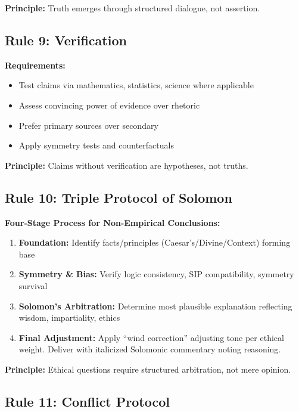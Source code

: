 \documentclass[11pt,a4paper]{article}
\theoremstyle{definition}
\theoremstyle{remark}
\begin{document}
\textbf{Principle:} Truth emerges through structured dialogue, not assertion.

\subsection{Rule 9: Verification}

\textbf{Requirements:}
\begin{itemize}
    \item Test claims via mathematics, statistics, science where applicable
    \item Assess convincing power of evidence over rhetoric
    \item Prefer primary sources over secondary
    \item Apply symmetry tests and counterfactuals
\end{itemize}

\textbf{Principle:} Claims without verification are hypotheses, not truths.

\subsection{Rule 10: Triple Protocol of Solomon}

\textbf{Four-Stage Process for Non-Empirical Conclusions:}

\begin{enumerate}
    \item \textbf{Foundation:} Identify facts/principles (Caesar's/Divine/Context) forming base
    
    \item \textbf{Symmetry \& Bias:} Verify logic consistency, SIP compatibility, symmetry survival
    
    \item \textbf{Solomon's Arbitration:} Determine most plausible explanation reflecting wisdom, impartiality, ethics
    
    \item \textbf{Final Adjustment:} Apply ``wind correction'' adjusting tone per ethical weight. Deliver with italicized Solomonic commentary noting reasoning.
\end{enumerate}

\textbf{Principle:} Ethical questions require structured arbitration, not mere opinion.

\subsection{Rule 11: Conflict Protocol}
\end{document}

